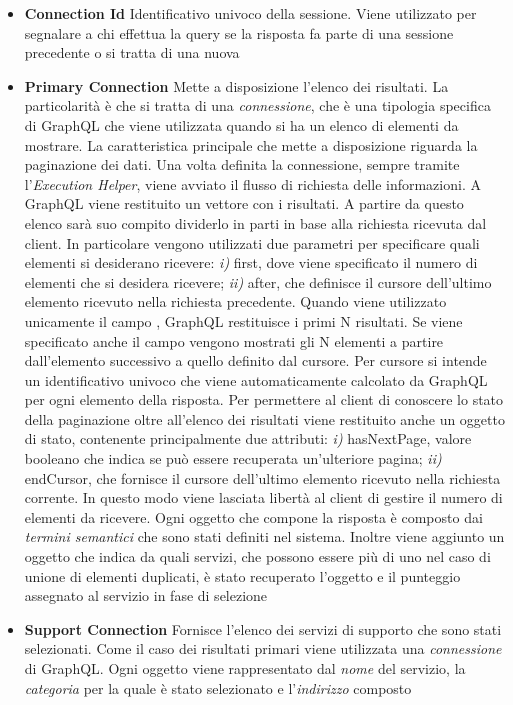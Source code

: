\begin{itemize}
	\item \textbf{Connection Id}
	Identificativo univoco della sessione. Viene utilizzato per segnalare a chi effettua la query se la risposta fa parte di una sessione precedente o si tratta di una nuova
	\item \textbf{Primary Connection}
	Mette a disposizione l'elenco dei risultati. La particolarità è che si tratta di una \emph{connessione}, che è una tipologia specifica di GraphQL che viene utilizzata quando si ha un elenco di elementi da mostrare. La caratteristica principale che mette a disposizione riguarda la paginazione dei dati. Una volta definita la connessione, sempre tramite l'\emph{Execution Helper}, viene avviato il flusso di richiesta delle informazioni. A GraphQL viene restituito un vettore con i risultati. A partire da questo elenco sarà suo compito dividerlo in parti in base alla richiesta ricevuta dal client. In particolare vengono utilizzati due parametri per specificare quali elementi si desiderano ricevere: \emph{i)} first, dove viene specificato il numero di elementi che si desidera ricevere; \emph{ii)} after, che definisce il cursore dell'ultimo elemento ricevuto nella richiesta precedente. Quando viene utilizzato unicamente il campo , GraphQL restituisce i primi N risultati. Se viene specificato anche il campo  vengono mostrati gli N elementi a partire dall'elemento successivo a quello definito dal cursore. Per cursore si intende un identificativo univoco che viene automaticamente calcolato da GraphQL per ogni elemento della risposta. Per permettere al client di conoscere lo stato della paginazione oltre all'elenco dei risultati viene restituito anche un oggetto di stato, contenente principalmente due attributi: \emph{i)} hasNextPage, valore booleano che indica se può essere recuperata un'ulteriore pagina; \emph{ii)} endCursor, che fornisce il cursore dell'ultimo elemento ricevuto nella richiesta corrente. In questo modo viene lasciata libertà al client di gestire il numero di elementi da ricevere. Ogni oggetto che compone la risposta è composto dai \emph{termini semantici} che sono stati definiti nel sistema. Inoltre viene aggiunto un oggetto che indica da quali servizi, che possono essere più di uno nel caso di unione di elementi duplicati, è stato recuperato l'oggetto e il punteggio assegnato al servizio in fase di selezione
	\item \textbf{Support Connection}
	Fornisce l'elenco dei servizi di supporto che sono stati selezionati. Come il caso dei risultati primari viene utilizzata una \emph{connessione} di GraphQL. Ogni oggetto viene rappresentato dal \emph{nome} del servizio, la \emph{categoria} per la quale è stato selezionato e l'\emph{indirizzo} composto
\end{itemize}

